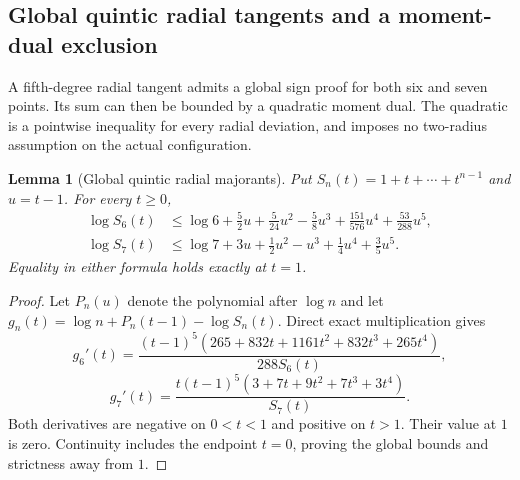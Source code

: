 \documentclass[11pt]{article}
\newtheorem{lemma}[theorem]{Lemma}
\theoremstyle{remark}
\numberwithin{equation}{section}
\begin{document}
\subsection{Global quintic radial tangents and a moment-dual exclusion}
\label{sec:noorigin-oct8-quintic-radial}

A fifth-degree radial tangent admits a global sign proof for both
six and seven points. Its sum can then be bounded by a quadratic
moment dual. The quadratic is a pointwise inequality for every
radial deviation, and imposes no two-radius assumption on the
actual configuration.

\begin{lemma}[Global quintic radial majorants]
\label{lem:noorigin-oct8-quintic-majorants}
Put $S_n(t)=1+t+\cdots+t^{n-1}$ and $u=t-1$. For every $t\ge0$,
\begin{align*}
 \log S_6(t)&\le\log6+\frac52u+\frac5{24}u^2-\frac58u^3
                       +\frac{151}{576}u^4+\frac{53}{288}u^5,\\
 \log S_7(t)&\le\log7+3u+\frac12u^2-u^3+\frac14u^4+\frac35u^5.
\end{align*}
Equality in either formula holds exactly at $t=1$.
\end{lemma}
\begin{proof}
Let $P_n(u)$ denote the polynomial after $\log n$ and let
$g_n(t)=\log n+P_n(t-1)-\log S_n(t)$.
Direct exact multiplication gives
\[
 g_6'(t)=\frac{(t-1)^5(265+832t+1161t^2+832t^3+265t^4)}
                      {288S_6(t)},
\]
\[
 g_7'(t)=\frac{t(t-1)^5(3+7t+9t^2+7t^3+3t^4)}{S_7(t)}.
\]
Both derivatives are negative on $0<t<1$ and positive on $t>1$.
Their value at $1$ is zero. Continuity includes the endpoint
$t=0$, proving the global bounds and strictness away from $1$.
\end{proof}
\end{document}
